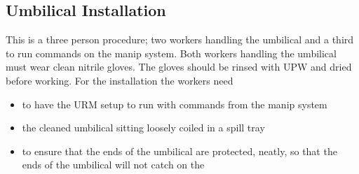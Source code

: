 \documentclass[11pt]{article}
\begin{document}

\subsection{Umbilical Installation}\label{ss:UmbInstall}
This is a three person procedure; two workers handling the umbilical
and a third to run commands on the manip system. Both workers handling
the umbilical must wear clean nitrile gloves. The gloves should be
rinsed with UPW and dried before working. For the installation the
workers need
\begin{itemize}
\item to have the URM setup to run with commands from the manip system
\item the cleaned umbilical sitting loosely coiled in a spill tray
\item to ensure that the ends of the umbilical are protected, neatly, so that the ends of the umbilical will not catch on the 
\end{itemize}
\end{document}
